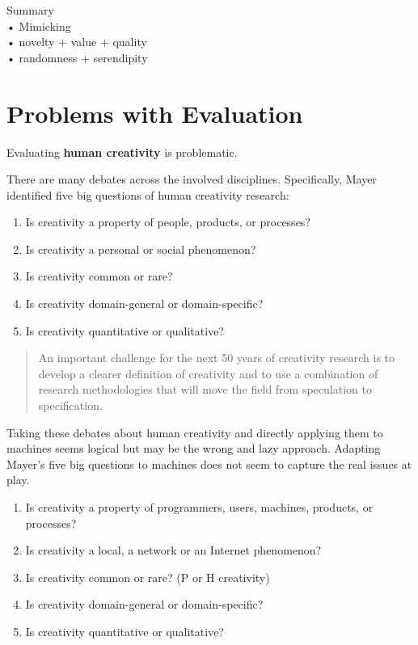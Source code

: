 \begin{comment}
  Temporal, spatial, ephemeral… what else?
\end{comment}

\begin{shaded}
  Summary\\
  •	Mimicking\\
  •	novelty + value + quality\\
  •	randomness + serendipity
\end{shaded}

\section{Problems with Evaluation}

Evaluating \textbf{human creativity} is problematic.

There are many debates across the involved disciplines. Specifically, Mayer identified five big questions of human creativity research: \citep[p.450-451]{Mayer1999}

\begin{enumerate}
  \item Is creativity a property of people, products, or processes?
  \item Is creativity a personal or social phenomenon?
  \item Is creativity common or rare?
  \item Is creativity domain-general or domain-specific?
  \item Is creativity quantitative or qualitative?
\end{enumerate}

\begin{quote}
  An important challenge for the next 50 years of creativity research is to develop a clearer definition of creativity and to use a combination of research methodologies that will move the field from speculation to specification. \citep[p.459]{Mayer1999}
\end{quote}

Taking these debates about human creativity and directly applying them to machines seems logical but may be the wrong and lazy approach. Adapting Mayer’s five big questions to machines does not seem to capture the real issues at play.

\begin{enumerate}
  \item Is creativity a property of programmers, users, machines, products, or processes?
  \item Is creativity a local, a network or an Internet phenomenon?
  \item Is creativity common or rare? (P or H creativity)
  \item Is creativity domain-general or domain-specific?
  \item Is creativity quantitative or qualitative?
\end{enumerate}

